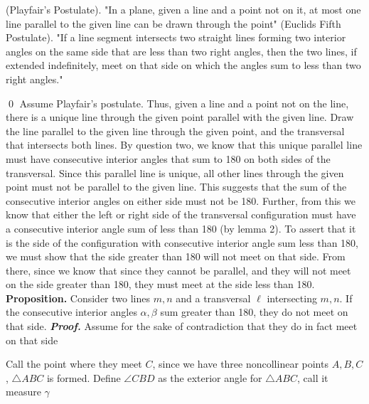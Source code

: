 \documentclass{report}
\begin{document}
        \bigbreak \noindent 
    \begin{remark}
        (Playfair's Postulate). "In a plane, given a line and a point not on it, at most one line parallel to the given line can be drawn through the point"
        \bigbreak \noindent 
        (Euclids Fifth Postulate). "If a line segment intersects two straight lines forming two interior angles on the same side that are less than two right angles, then the two lines, if extended indefinitely, meet on that side on which the angles sum to less than two right angles."
    \end{remark}
    \qed
    \bigbreak \noindent 
    Assume Playfair's postulate. Thus, given a line and a point not on the line, there is a unique line through the given point parallel with the given line. Draw the line parallel to the given line through the given point, and the transversal that intersects both lines. By question two, we know that this unique parallel line must have consecutive interior angles that sum to 180 on both sides of the transversal. Since this parallel line is unique, all other lines through the given point must not be parallel to the given line. This suggests that the sum of the consecutive interior angles on either side must not be 180. Further, from this we know that either the left or right side of the transversal configuration must have a consecutive interior angle sum of less than 180 (by lemma 2). To assert that it is the side of the configuration with consecutive interior angle sum less than 180, we must show that the side greater than 180 will not meet on that side. From there, since we know that since they cannot be parallel, and they will not meet on the side greater than 180, they must meet at the side less than 180.
    \bigbreak \noindent 
    \textbf{Proposition.} Consider two lines $m,n$ and a transversal $\ell$ intersecting $m,n$. If the consecutive interior angles $\alpha,\beta$ sum greater than 180, they do not meet on that side.
    \bigbreak \noindent 
    \textbf{\textit{Proof.}} Assume for the sake of contradiction that they do in fact meet on that side
    \pagebreak \bigbreak \noindent 
    \begin{figure}[ht]
        \centering
        \label{fig:tr2}
    \end{figure}
    \bigbreak \noindent 
    Call the point where they meet $C$, since we have three noncollinear points $A,B,C$, $\triangle ABC$ is formed.
    \bigbreak \noindent 
    Define $\angle CBD$ as the exterior angle for $\triangle ABC$, call it measure $\gamma$
\end{document}
